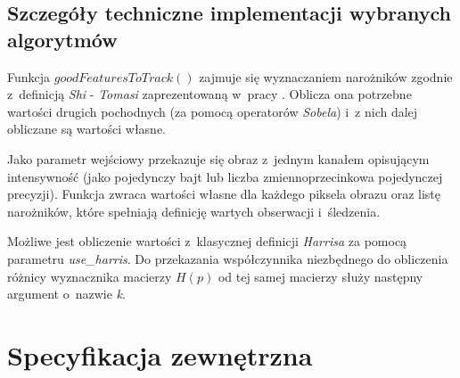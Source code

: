   \section{Szczegóły techniczne implementacji wybranych algorytmów}\label{Section_ImplementationDetails}

  Funkcja $goodFeaturesToTrack()$ zajmuje się wyznaczaniem narożników zgodnie z~definicją \textit{Shi} - \textit{Tomasi} zaprezentowaną w~pracy \cite{GoodFeaturesToTrack94}. Oblicza ona potrzebne wartości drugich pochodnych (za pomocą operatorów \textit{Sobela}) i~z nich dalej obliczane są wartości własne.

  Jako parametr wejściowy przekazuje się obraz z~jednym kanałem opisującym intensywność (jako pojedynczy bajt lub liczba zmiennoprzecinkowa pojedynczej precyzji). Funkcja zwraca wartości własne dla każdego piksela obrazu oraz listę narożników, które spełniają definicję wartych obserwacji i~śledzenia.

  Możliwe jest obliczenie wartości z~klasycznej definicji \textit{Harrisa} za pomocą parametru \textit{use\_harris}. Do przekazania współczynnika niezbędnego do obliczenia różnicy wyznacznika macierzy $H(p)$ od tej samej macierzy służy następny argument o~nazwie \textit{k}.

\chapter{Specyfikacja zewnętrzna}\label{Chapter_SpecyfikacjaZewnetrzna}